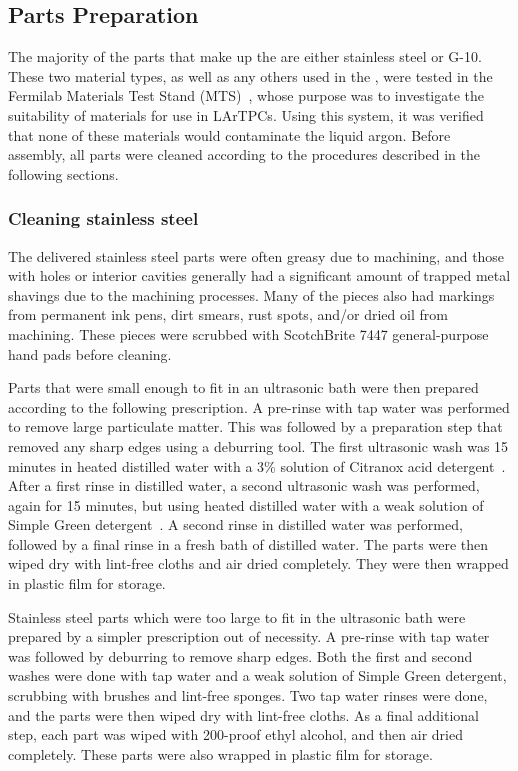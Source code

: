 %
\subsection{Parts Preparation}

The majority of the parts that make up the \lartpc are either stainless steel or G-10. These two material types, as well as any others used in the \lartpc, were tested in the Fermilab Materials Test Stand (MTS)~\cite{Rebel:2011-MTS}, whose purpose was to investigate the suitability of materials for use in LArTPCs.  Using this system, it was verified that none of these materials would contaminate the liquid argon.  Before assembly, all \lartpc parts were cleaned according to the procedures described in the following sections.

\subsubsection{Cleaning stainless steel}

The delivered stainless steel parts were often greasy due to machining, and those with holes or interior cavities generally had a significant amount of trapped metal shavings due to the machining processes. Many of the pieces also had markings from permanent ink pens, dirt smears, rust spots, and/or dried oil from machining. These pieces were scrubbed with ScotchBrite 7447 general-purpose hand pads before cleaning.

Parts that were small enough to fit in an ultrasonic bath were then prepared according to the following prescription. A pre-rinse with tap water was performed to remove large particulate matter. This was followed by a preparation step that removed any sharp edges using a deburring tool. The first ultrasonic wash was 15 minutes in heated distilled water with a 3\% solution of Citranox acid detergent~\cite{citranox}. After a first rinse in distilled water, a second ultrasonic wash was performed, again for 15 minutes, but using heated distilled water with a weak solution of Simple Green detergent~\cite{simplegreen}. A second rinse in distilled water was performed, followed by a final rinse in a fresh bath of distilled water. The parts were then wiped dry with lint-free cloths and air dried completely. They were then wrapped in plastic film for storage.

Stainless steel parts which were too large to fit in the ultrasonic bath were prepared by a simpler prescription out of necessity. A pre-rinse with tap water was followed by deburring to remove sharp edges. Both the first and second washes were done with tap water and a weak solution of Simple Green detergent, scrubbing with brushes and lint-free sponges. Two tap water rinses were done, and the parts were then wiped dry with lint-free cloths. As a final additional step, each part was wiped with 200-proof ethyl alcohol, and then air dried completely. These parts were also wrapped in plastic film for storage.

